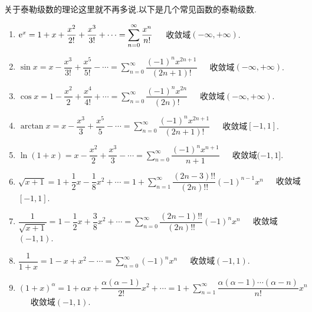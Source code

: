 \documentclass{ctexart}
\begin{document}
关于泰勒级数的理论这里就不再多说.以下是几个常见函数的泰勒级数.
\begin{enumerate}[label=\tbf{(\arabic*)},leftmargin=*]
    \item $\mathrm{e}^x=1+x+\dfrac{x^2}{2!}+\dfrac{x^3}{3!}+\cdots=\displaystyle\sum_{n=0}^\infty\dfrac{x^n}{n!}$\ \ \ 收敛域$(-\infty,+\infty)$.
    \item $\sin x=x-\dfrac{x^3}{3!}+\dfrac{x^5}{5!}-\cdots=\displaystyle\sum_{n=0}^\infty\dfrac{(-1)^{n}x^{2n+1}}{(2n+1)!}$\ \ \ 收敛域$(-\infty,+\infty)$.
    \item $\cos x=1-\dfrac{x^2}{2}+\dfrac{x^4}{4!}+\cdots=\displaystyle\sum_{n=0}^\infty\dfrac{(-1)^{n}x^{2n}}{(2n)!}$\ \ \ 收敛域$(-\infty,+\infty)$.
    \item $\arctan x=x-\dfrac{x^3}{3}+\dfrac{x^5}{5}-\cdots=\displaystyle\sum_{n=0}^\infty\dfrac{(-1)^nx^{2n+1}}{(2n+1)!}$\ \ \ 收敛域$[-1,1]$.
    \item $\ln(1+x)=x-\dfrac{x^2}{2}+\dfrac{x^3}{3}-\cdots=\displaystyle\sum_{n=0}^\infty\dfrac{(-1)^nx^{n+1}}{n+1}$\ \ \ 收敛域$(-1,1]$.
    \item $\sqrt{x+1}=1+\dfrac{1}{2}x-\dfrac{1}{8}x^2+\cdots=1+\displaystyle\sum_{n=1}^\infty\dfrac{(2n-3)!!}{(2n)!!}(-1)^{n-1}x^n$\ \ \ 收敛域$[-1,1]$.
    \item $\dfrac{1}{\sqrt{x+1}}=1-\dfrac12x+\dfrac{3}{8}x^2+\cdots=\displaystyle\sum_{n=0}^\infty\dfrac{(2n-1)!!}{(2n)!!}(-1)^nx^n$\ \ \ 收敛域$(-1,1)$.
    \item $\dfrac{1}{1+x}=1-x+x^2-\cdots=\displaystyle\sum_{n=0}^\infty(-1)^nx^n$\ \ \ 收敛域$(-1,1)$.
    \item $(1+x)^\alpha=1+\alpha x+\dfrac{\alpha(\alpha-1)}{2!}x^2+\cdots=1+\displaystyle\sum_{n=1}^\infty\dfrac{\alpha(\alpha-1)\cdots(\alpha-n)}{n!}x^n$\ \ \ 收敛域$(-1,1)$.
\end{enumerate}
\end{document}
